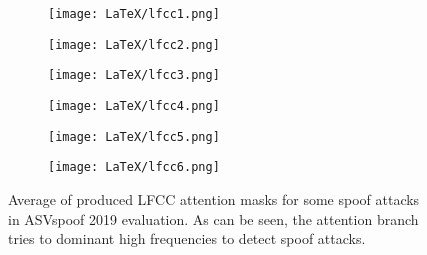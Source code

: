 \documentclass[a4paper]{article}
\begin{document}
\begin{figure}[H]
    \centering
    \begin{subfigure}[b]{0.23\textwidth}
        \centering
        \texttt{[image: LaTeX/lfcc1.png]}
    \end{subfigure}
    \hfill
    \begin{subfigure}[b]{0.23\textwidth}
        \centering
        \texttt{[image: LaTeX/lfcc2.png]}
    \end{subfigure}
    \hfill
    \begin{subfigure}[b]{0.23\textwidth}
        \centering
        \texttt{[image: LaTeX/lfcc3.png]}
    \end{subfigure}
    \hfill
    \begin{subfigure}[b]{0.23\textwidth}
        \centering
        \texttt{[image: LaTeX/lfcc4.png]}
    \end{subfigure}
    \hfill
    \begin{subfigure}[b]{0.23\textwidth}
        \centering
        \texttt{[image: LaTeX/lfcc5.png]}
    \end{subfigure}
    \hfill
    \begin{subfigure}[b]{0.23\textwidth}
        \centering
        \texttt{[image: LaTeX/lfcc6.png]}
    \end{subfigure}
    \hfill
    \caption{Average of produced LFCC attention masks for some spoof attacks in ASVspoof 2019 evaluation. As can be seen, the attention branch tries to dominant high frequencies to detect spoof attacks.}
    \label{fig:lfcc}
\end{figure}
\end{document}
